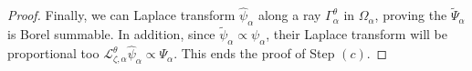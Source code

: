 \documentclass{article}
\newcommand{\series}[1]{\tilde{#1}}
\newcommand{\laplace}{\mathcal{L}}
\newcommand{\borel}{\mathcal{B}}
\theoremstyle{definition}
\theoremstyle{plain}
\begin{document}
\begin{proof}
Finally, we can Laplace transform $\hat{\psi}_\alpha$ along a ray $\Gamma_{\alpha}^\theta$ in $\Omega_\alpha$, proving the $\tilde{\Psi}_\alpha$ is Borel summable. In addition, since $\tilde{\psi}_\alpha\propto\psi_\alpha$, their Laplace transform will be proportional too $\laplace_{\zeta,\alpha}^\theta\hat{\psi}_\alpha\propto \Psi_\alpha$. This ends the proof of Step $(c)$. 
 










%


\end{proof}
\end{document}
